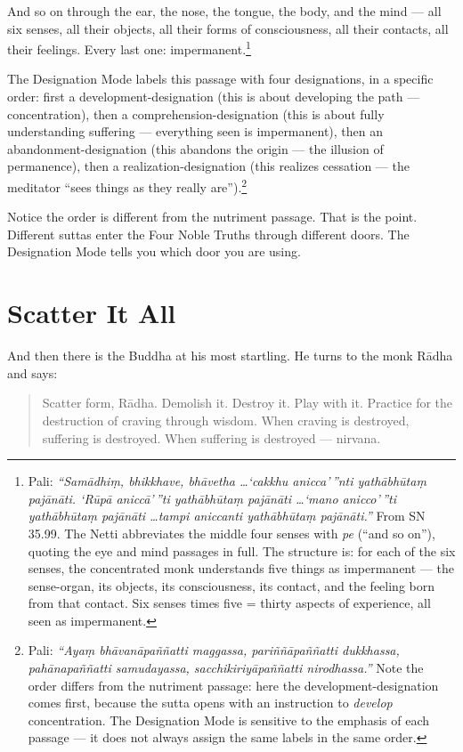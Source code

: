 And so on through the ear, the nose, the tongue, the body, and the mind --- all six senses, all their objects, all their forms of consciousness, all their contacts, all their feelings. Every last one: impermanent.\footnote{Pali: \textit{``Samādhiṃ, bhikkhave, bhāvetha \ldots `cakkhu anicca'\,''nti yathābhūtaṃ pajānāti. `Rūpā aniccā'\,''ti yathābhūtaṃ pajānāti \ldots `mano anicco'\,''ti yathābhūtaṃ pajānāti \ldots tampi aniccanti yathābhūtaṃ pajānāti.''} From SN 35.99. The Netti abbreviates the middle four senses with \textit{pe} (``and so on''), quoting the eye and mind passages in full. The structure is: for each of the six senses, the concentrated monk understands five things as impermanent --- the sense-organ, its objects, its consciousness, its contact, and the feeling born from that contact. Six senses times five = thirty aspects of experience, all seen as impermanent.}

The Designation Mode labels this passage with four designations, in a specific order: first a development-designation (this is about developing the path --- concentration), then a comprehension-designation (this is about fully understanding suffering --- everything seen is impermanent), then an abandonment-designation (this abandons the origin --- the illusion of permanence), then a realization-designation (this realizes cessation --- the meditator ``sees things as they really are'').\footnote{Pali: \textit{``Ayaṃ bhāvanāpaññatti maggassa, pariññāpaññatti dukkhassa, pahānapaññatti samudayassa, sacchikiriyāpaññatti nirodhassa.''} Note the order differs from the nutriment passage: here the development-designation comes first, because the sutta opens with an instruction to \textit{develop} concentration. The Designation Mode is sensitive to the emphasis of each passage --- it does not always assign the same labels in the same order.}

Notice the order is different from the nutriment passage. That is the point. Different suttas enter the Four Noble Truths through different doors. The Designation Mode tells you which door you are using.

\section*{Scatter It All}

And then there is the Buddha at his most startling. He turns to the monk Rādha and says:

\begin{quote}
Scatter form, Rādha. Demolish it. Destroy it. Play with it. Practice for the destruction of craving through wisdom. When craving is destroyed, suffering is destroyed. When suffering is destroyed --- nirvana.
\end{quote}

